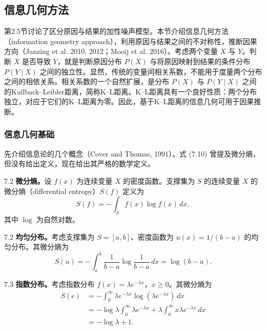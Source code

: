 \subsection{信息几何方法}
第2.5节讨论了区分原因与结果的加性噪声模型。本节介绍信息几何方法（information geometry approach），利用原因与结果之间的不对称性，推断因果方向（Janzing et al. 2010, 2012；Mooij et al. 2016）。考虑两个变量 $X$ 与 $Y$。判断 $X$ 是否导致 $Y$，就是判断原因分布 $P(X)$ 与将原因映射到结果的条件分布 $P(Y\mid X)$ 之间的独立性。显然，传统的变量间相关系数，不能用于度量两个分布之间的相依关系。相关系数的一个自然扩展，是分布 $P(X)$ 与 $P(Y\mid X)$ 之间的Kullback–Leibler距离，简称K–L距离。K–L距离具有一个良好性质：两个分布独立，对应于它们的K–L距离为零。因此，基于K–L距离的信息几何可用于因果推断。

\subsubsection{信息几何基础}
先介绍信息论的几个概念（Cover and Thomas, 1991）。式 (7.10) 曾提及微分熵，但没有给出定义，现在给出其严格的数学定义。

\begin{bookdefinition}{7.2}
\textbf{微分熵。}设 $f(x)$ 为连续变量 $X$ 的密度函数。支撑集为 $S$ 的连续变量 $X$ 的微分熵（differential entropy）$S(f)$ 定义为
\begin{equation}
S(f)=-\int_S f(x)\log f(x)\,dx,
\tag{7.12}
\end{equation}
其中 $\log$ 为自然对数。
\end{bookdefinition}

\begin{bookexample}{7.2}
\textbf{均匀分布。}考虑支撑集为 $S=[a,b]$、密度函数为 $u(x)=1/(b-a)$ 的均匀分布。其微分熵为
\begin{equation}
S(u)=-\int_a^b\frac1{b-a}\log\frac1{b-a}\,dx=\log(b-a).
\tag{7.13}
\end{equation}
\end{bookexample}

\begin{bookexample}{7.3}
\textbf{指数分布。}考虑指数分布 $f(x)=\lambda e^{-\lambda x}$，$x\ge0$。其微分熵为
\begin{equation}
\begin{aligned}
S(e)&=-\int_0^\infty\lambda e^{-\lambda x}\log(\lambda e^{-\lambda x})\,dx\\
&=-\log\lambda\int_0^\infty\lambda e^{-\lambda x}
+\lambda\int_0^\infty x\lambda e^{-\lambda x}\,dx\\
&=-\log\lambda+1.
\end{aligned}
\tag{7.14}
\end{equation}
\end{bookexample}

